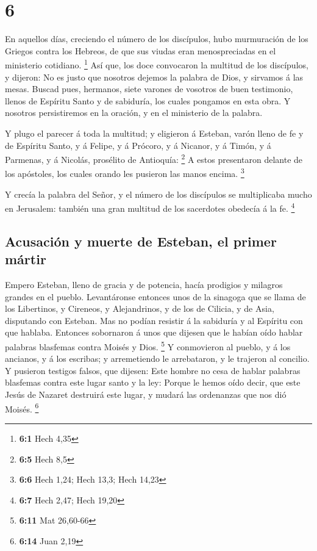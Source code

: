 \hypertarget{section-5}{%
\section{6}\label{section-5}}

 En aquellos días, creciendo el número de los discípulos,
hubo murmuración de los Griegos contra los Hebreos, de que sus viudas
eran menospreciadas en el ministerio cotidiano. \footnote{\textbf{6:1}
  Hech 4,35}  Así que, los doce convocaron la multitud de
los discípulos, y dijeron: No es justo que nosotros dejemos la palabra
de Dios, y sirvamos á las mesas.  Buscad pues, hermanos,
siete varones de vosotros de buen testimonio, llenos de Espíritu Santo y
de sabiduría, los cuales pongamos en esta obra.  Y nosotros
persistiremos en la oración, y en el ministerio de la palabra.

 Y plugo el parecer á toda la multitud; y eligieron á
Esteban, varón lleno de fe y de Espíritu Santo, y á Felipe, y á Prócoro,
y á Nicanor, y á Timón, y á Parmenas, y á Nicolás, prosélito de
Antioquía: \footnote{\textbf{6:5} Hech 8,5}  A estos
presentaron delante de los apóstoles, los cuales orando les pusieron las
manos encima. \footnote{\textbf{6:6} Hech 1,24; Hech 13,3; Hech 14,23}

 Y crecía la palabra del Señor, y el número de los
discípulos se multiplicaba mucho en Jerusalem: también una gran multitud
de los sacerdotes obedecía á la fe. \footnote{\textbf{6:7} Hech 2,47;
  Hech 19,20}

\hypertarget{acusaciuxf3n-y-muerte-de-esteban-el-primer-muxe1rtir}{%
\subsection{Acusación y muerte de Esteban, el primer
mártir}\label{acusaciuxf3n-y-muerte-de-esteban-el-primer-muxe1rtir}}

 Empero Esteban, lleno de gracia y de potencia, hacía
prodigios y milagros grandes en el pueblo.  Levantáronse
entonces unos de la sinagoga que se llama de los Libertinos, y Cireneos,
y Alejandrinos, y de los de Cilicia, y de Asia, disputando con Esteban.
 Mas no podían resistir á la sabiduría y al Espíritu con
que hablaba.  Entonces sobornaron á unos que dijesen que le
habían oído hablar palabras blasfemas contra Moisés y Dios. \footnote{\textbf{6:11}
  Mat 26,60-66}  Y conmovieron al pueblo, y á los ancianos,
y á los escribas; y arremetiendo le arrebataron, y le trajeron al
concilio.  Y pusieron testigos falsos, que dijesen: Este
hombre no cesa de hablar palabras blasfemas contra este lugar santo y la
ley:  Porque le hemos oído decir, que este Jesús de Nazaret
destruirá este lugar, y mudará las ordenanzas que nos dió Moisés.
\footnote{\textbf{6:14} Juan 2,19}


